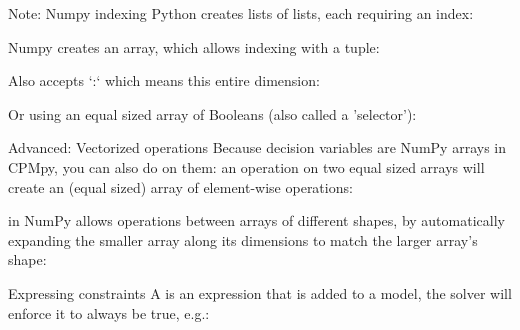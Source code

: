 \documentclass{cons-beamer}
\begin{document}
\begin{flashcardcpmpy}
\begin{frame}{Note: Numpy indexing}
  Python creates lists of lists, each requiring an index:
  

  Numpy creates an array, which allows indexing with a tuple:
  

  Also accepts `:` which means this entire dimension:
  

  Or using an equal sized array of Booleans (also called a 'selector'):
  
\end{frame}

\begin{frame}{Advanced: Vectorized operations}
  Because decision variables are NumPy arrays in CPMpy, you can also do  on them: an operation on two equal sized arrays will create an (equal sized) array of element-wise operations:

  \begin{example}
    \vspace{-0.5em}
    
    \vspace{-0.5em}
  \end{example}

   in NumPy allows operations between arrays of different shapes, by automatically expanding the smaller array along its dimensions to match the larger array's shape: %

  \begin{example}[broadcasting]
    \vspace{-0.5em}
    
    \vspace{-0.5em}
  \end{example}
\end{frame}

\begin{frame}{Expressing constraints}
  A  is an expression that is added to a model, the solver will enforce it to always be true, e.g.:


\end{frame}
\end{flashcardcpmpy}
\end{document}
